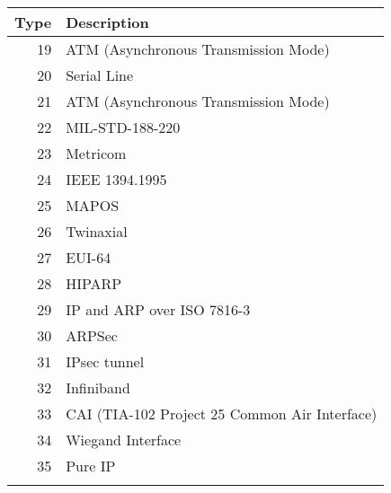 \documentclass[documentation]{subfiles}
\begin{document}
\begin{minipage}{.48\textwidth}
    \small
    \begin{longtable}{rl}
        \toprule
        {\bf Type} & {\bf Description}\\
        \midrule\endhead%
        19 & ATM (Asynchronous Transmission Mode)\\
        20 & Serial Line\\
        21 & ATM (Asynchronous Transmission Mode)\\
        22 & MIL-STD-188-220\\
        23 & Metricom\\
        24 & IEEE 1394.1995\\
        25 & MAPOS\\
        26 & Twinaxial\\
        27 & EUI-64\\
        28 & HIPARP\\
        29 & IP and ARP over ISO 7816-3\\
        30 & ARPSec\\
        31 & IPsec tunnel\\
        32 & Infiniband\\
        33 & CAI (TIA-102 Project 25 Common Air Interface)\\
        34 & Wiegand Interface\\
        35 & Pure IP\\
        \\
        \bottomrule
    \end{longtable}
\end{minipage}
\end{document}

